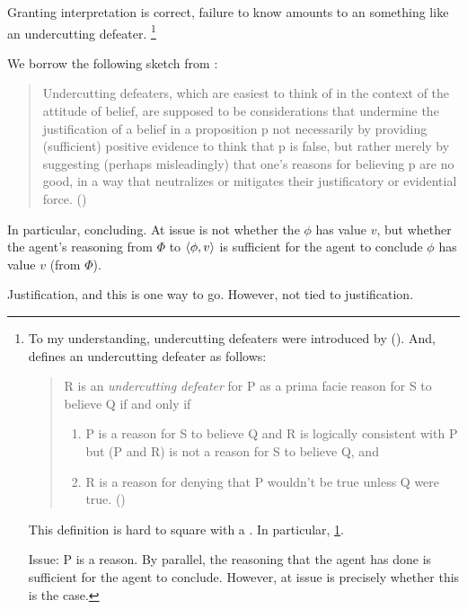 \begin{note}
  Granting interpretation is correct, failure to know \fc{} amounts to an something like an undercutting defeater.%
  \footnote{
    To my understanding, undercutting defeaters were introduced by \citeauthor{Pollock:1987un} (\citeyear{Pollock:1987un}).
    And, \citeauthor{Pollock:1987un} defines an undercutting defeater as follows:
    \begin{quote}
    R is an \emph{undercutting defeater} for P as a prima facie reason for S to believe Q if and only if
    \begin{enumerate}[label=(UD\arabic*), ref=(UD\arabic*)]
    \item
      \label{pollock:ud:1}
      P is a reason for S to believe Q and R is logically consistent with P but (P and R) is not a reason for S to believe Q, and
    \item
      \label{pollock:ud:2}
      R is a reason for denying that P wouldn't be true unless Q were true.%
      \mbox{}\hfill\mbox{(\citeyear[485]{Pollock:1987un})}
    \end{enumerate}
  \end{quote}
  This definition is hard to square with a \requ{}.
  In particular, \ref{pollock:ud:1}.

  Issue: P is a reason.
  By parallel, the reasoning that the agent has done is sufficient for the agent to conclude.
  However, at issue is precisely whether this is the case.
  }

  We borrow the following sketch from \textcite{Worsnip:2018aa}:
  \begin{quote}
    Undercutting defeaters, which are easiest to think of in the context of the attitude of belief, are supposed to be considerations that undermine the justification of a belief in a proposition p not necessarily by providing (sufficient) positive evidence to think that p is false, but rather merely by suggesting (perhaps misleadingly) that one’s reasons for believing p are no good, in a way that neutralizes or mitigates their justificatory or evidential force.%
    \mbox{}\hfill\mbox{(\citeyear[29]{Worsnip:2018aa})}
  \end{quote}

  In particular, concluding.
  At issue is not whether the \(\phi\) has value \(v\), but whether the agent's reasoning from \(\Phi\) to \(\langle \phi, v \rangle\) is sufficient for the agent to conclude \(\phi\) has value \(v\) (from \(\Phi\)).

  Justification, and this is one way to go.
  However, not tied to justification.
\end{note}


